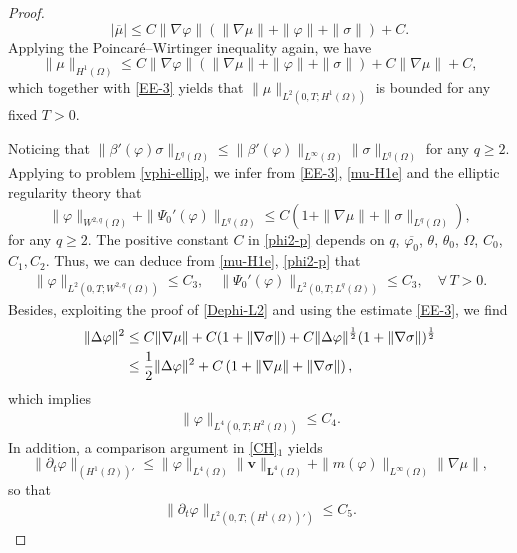 \documentclass[11pt,reqno]{amsart}
\def\vv{\bm{v}}
\begin{document}
\begin{proof}
$$
|\overline{\mu}|\leq C \|\nabla \varphi\|\left(\| \nabla \mu\|+\|\varphi\| + \| \sigma\|\right)+C.
$$
Applying the Poincar\'{e}--Wirtinger inequality again, we have
%
\begin{equation}
\label{mu-H1e}
\| \mu\|_{H^1(\Omega)}\leq
 C \|\nabla \varphi\|\left(\| \nabla \mu\|+\|\varphi\| + \| \sigma\|\right)+C\|\nabla \mu\|+C,
\end{equation}
%
which together with \eqref{EE-3} yields that  $\|\mu\|_{L^2(0,T;H^1(\Omega))}$ is bounded for any fixed $T>0$.

Noticing that $\|\beta'(\varphi)\sigma\|_{L^q(\Omega)}\leq \|\beta'(\varphi)\|_{L^\infty(\Omega)}\|\sigma\|_{L^q(\Omega)}$ for any $q\geq 2$. Applying \cite[Lemma A.1]{CG2020} to problem \eqref{vphi-ellip}, we infer from \eqref{EE-3}, \eqref{mu-H1e} and the elliptic regularity theory that
%
\begin{equation}
\label{phi2-p}
\| \varphi\|_{W^{2,q}(\Omega)}+ \|\Psi_0'(\varphi)\|_{L^q(\Omega)}\leq C\left( 1+ \| \nabla\mu\|  +  \|  \sigma\|_{L^q(\Omega)} \right),
\end{equation}
for any $q\geq 2$.
%
The positive constant $C$ in \eqref{phi2-p} depends on $q$, $\overline{\varphi_0}$, $\theta$, $\theta_0$, $\Omega$, $C_0$, $C_1, C_2$.
%
Thus, we can deduce from \eqref{mu-H1e}, \eqref{phi2-p} that
%
\begin{align}
\label{phi-w2p}
\|\varphi\|_{L^2(0,T;W^{2,q}(\Omega))}\leq C_3,\quad \|\Psi_0'(\varphi)\|_{L^2(0,T;L^q(\Omega))}\leq C_3,\quad \forall\, T>0.
\end{align}
%
Besides, exploiting the proof of \eqref{Dephi-L2} and using the estimate \eqref{EE-3}, we find
%
\begin{align}
\|\Delta \varphi\|^2
&\leq C\|\nabla \mu\|
  + C(1+\|\nabla \sigma\|)
  + C\|\Delta \varphi\|^\frac12(1+\|\nabla \sigma\|)^\frac12
\notag\\
&\leq  \frac12 \|\Delta\varphi\|^2+ C \left( 1+ \| \nabla \mu\|+ \| \nabla \sigma\|\right),
\label{Dephi-L2b}
\end{align}
%
which implies
%
\begin{align}
\label{phi-l4H2}
\|\varphi\|_{L^4(0,T;H^{2}(\Omega))}\leq C_4.
\end{align}
%
In addition, a comparison argument in \eqref{CH}$_1$ yields
%
\begin{equation}
\label{phit-est}
\| \partial_t \varphi\|_{(H^1(\Omega))'}
\leq \|\varphi\|_{L^4(\Omega)} \| \vv \|_{\bm{L}^4(\Omega)}
+ \|m(\varphi)\|_{L^\infty(\Omega)}\|\nabla \mu \|,
\end{equation}
so that
\begin{align}
\label{phit-2}
\| \partial_t \varphi\|_{L^2(0,T;(H^1(\Omega))')}\leq C_5.
\end{align}
%


\end{proof}
\end{document}
